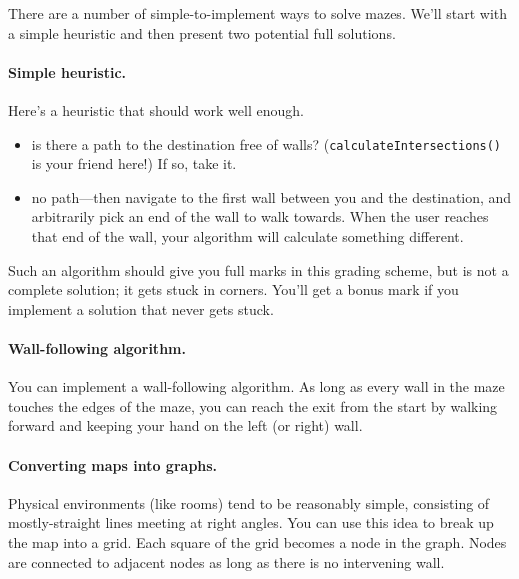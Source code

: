 \documentclass[10pt]{article}
\begin{document}


There are a number of simple-to-implement ways to solve mazes. We'll
start with a simple heuristic and then present two potential full
solutions.

\paragraph{Simple heuristic.} Here's a heuristic that
should work well enough.
\vspace*{-1em}
\begin{itemize}
\item is there a path to the destination free of walls? ({\tt calculateIntersections()} is your
friend here!) If so, take it.
\item no path---then navigate to the first wall between you and the
  destination, and arbitrarily pick an end of the wall to walk
  towards. When the user reaches that end of the wall, your algorithm will calculate
  something different.
\end{itemize}
Such an algorithm should give you full marks in this grading scheme, but is not a complete
solution; it gets stuck in corners. You'll get a bonus mark if you implement a solution that never gets stuck.

\paragraph{Wall-following algorithm.} You can implement a wall-following algorithm.
As long as every wall in the maze touches the edges of the maze, you
can reach the exit from the start by walking forward and keeping your
hand on the left (or right) wall. 

\paragraph{Converting maps into graphs.} 
Physical environments (like rooms) tend to be reasonably simple,
consisting of mostly-straight lines meeting at right angles. You can use
this idea to break up the map into a grid. Each square of the grid
becomes a node in the graph. Nodes are connected to adjacent
nodes as long as there is no intervening wall. 
\end{document}
